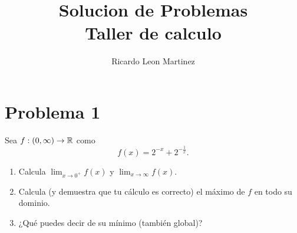 \documentclass[12pt,a4paper]{article}
\title{Solucion de Problemas\\
Taller de calculo}
\author{Ricardo Leon Martinez}
\begin{document}
    \maketitle

    \section*{Problema 1}

    Sea $f:(0,\infty)\to\mathbb{R}$ como
    \begin{equation*}
        f(x)=2^{-x}+2^{-\frac{1}{x}}.
    \end{equation*}

    \begin{enumerate}
        \item[(a)] Calcula $\lim_{x\to0^{+}}f(x)$ y $\lim_{x\to\infty}f(x)$.
        \item[(b)] Calcula (y demuestra que tu cálculo es correcto) el máximo de $f$ en
        todo su dominio.
        \item[(c)] ¿Qué puedes decir de su mínimo (también global)? 
    \end{enumerate}
\end{document}
